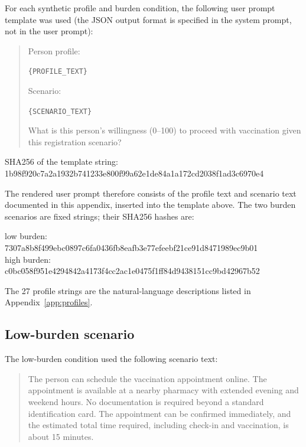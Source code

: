 \documentclass[11pt]{article}
\begin{document}
For each synthetic profile and burden condition, the following user prompt template was used (the JSON output format is specified in the system prompt, not in the user prompt):

\begin{quote}
Person profile:

\texttt{\{PROFILE\_TEXT\}}

Scenario:

\texttt{\{SCENARIO\_TEXT\}}

What is this person's willingness (0--100) to proceed with vaccination given this registration scenario?

\end{quote}
\begin{flushleft}
{\footnotesize SHA256 of the template string:}\\
{\footnotesize\ttfamily 1b98f920c7a2a1932b741233e800f99a62e1de84a1a172cd2038f1ad3c6970e4}
\end{flushleft}

The rendered user prompt therefore consists of the profile text and scenario text documented in this appendix, inserted into the template above. The two burden scenarios are fixed strings; their SHA256 hashes are:
\begin{flushleft}
{\footnotesize low burden:}\\
{\footnotesize\ttfamily 7307a8b8f499ebc0897c6fa0436fb8eafb3e77efeebf21ce91d8471989ec9b01}\\
{\footnotesize high burden:}\\
{\footnotesize\ttfamily c0bc058f951e4294842a4173f4cc2ac1e0475f1ff84d9438151cc9bd42967b52}
\end{flushleft} The 27 profile strings are the natural-language descriptions listed in Appendix~\ref{app:profiles}.

\subsection*{Low-burden scenario}

The low-burden condition used the following scenario text:

\begin{quote}
The person can schedule the vaccination appointment online. The appointment is available at a nearby pharmacy with extended evening and weekend hours. No documentation is required beyond a standard identification card. The appointment can be confirmed immediately, and the estimated total time required, including check-in and vaccination, is about 15 minutes.
\end{quote}
\end{document}
